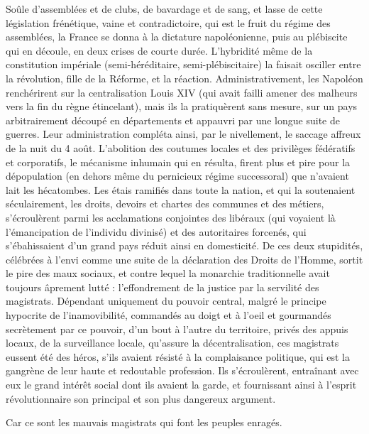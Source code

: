 \documentclass[french,twoside]{book} %
\begin{document}
Soûle d’assemblées et de clubs, de bavardage et de sang, et lasse de cette législation frénétique, vaine et contradictoire, qui est le fruit du régime des assemblées, la France se donna à la dictature napoléonienne, puis au plébiscite qui en découle, en deux crises de courte durée. L’hybridité même de la constitution impériale (semi-héréditaire, semi-plébiscitaire) la faisait osciller entre la révolution, fille de la Réforme, et la réaction. Administrativement, les Napoléon renchérirent sur la centralisation Louis XIV (qui avait failli amener des malheurs vers la fin du règne étincelant), mais ils la pratiquèrent sans mesure, sur un pays arbitrairement découpé en départements et appauvri par une longue suite de guerres. Leur administration compléta ainsi, par le nivellement, le saccage affreux de la nuit du 4 août. L’abolition des coutumes locales et des privilèges fédératifs et corporatifs, le mécanisme inhumain qui en résulta, firent plus et pire pour la dépopulation (en dehors même du pernicieux régime successoral) que n’avaient lait les hécatombes. Les étais ramifiés dans toute la nation, et qui la soutenaient séculairement, les droits, devoirs et chartes des communes et des métiers, s’écroulèrent parmi les acclamations conjointes des libéraux (qui voyaient là l’émancipation de l’individu divinisé) et des autoritaires forcenés, qui s’ébahissaient d’un grand pays réduit ainsi en domesticité. De ces deux stupidités, célébrées à l’envi comme une suite de la déclaration des Droits de l’Homme, sortit le pire des maux sociaux, et contre lequel la monarchie traditionnelle avait toujours âprement lutté : l’effondrement de la justice par la servilité des magistrats. Dépendant uniquement du pouvoir central, malgré le principe hypocrite de l’inamovibilité, commandés au doigt et à l’oeil et gourmandés secrètement par ce pouvoir, d’un bout à l’autre du territoire, privés des appuis locaux, de la surveillance locale, qu’assure la décentralisation, ces magistrats eussent été des héros, s’ils avaient résisté à la complaisance politique, qui est la gangrène de leur haute et redoutable profession. Ils s’écroulèrent, entraînant avec eux le grand intérêt social dont ils avaient la garde, et fournissant ainsi à l’esprit révolutionnaire son principal et son plus dangereux argument.\par
Car ce sont les mauvais magistrats qui font les peuples enragés.\par
\end{document}

